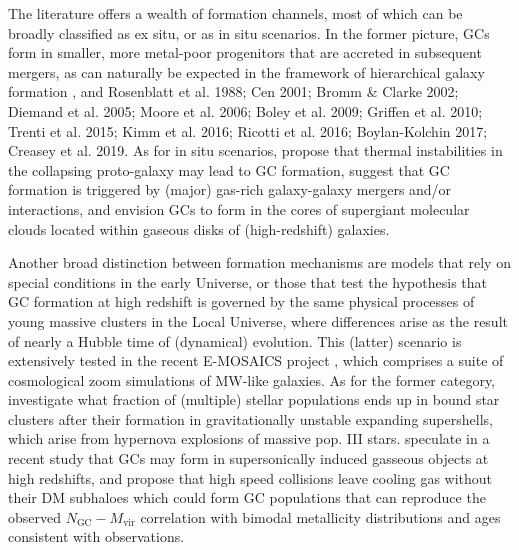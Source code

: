 \documentclass[a4paper,fleqn,usenatbib]{mnras}
\begin{document}
The literature offers a wealth of formation channels, most of which can be broadly
classified as ex situ, or as in situ scenarios. In the former picture, GCs form
in smaller, more metal-poor progenitors that are accreted in subsequent mergers,
as can naturally be expected in the framework of hierarchical galaxy formation
\citep[e.g.][]{1978ApJ...225..357S, 1984ApJ...277..470P}, and Rosenblatt et al. 1988;
Cen 2001; Bromm \& Clarke 2002; Diemand et al. 2005; Moore et al. 2006; Boley et al. 2009;
Griffen et al. 2010; Trenti et al. 2015; Kimm et al. 2016; Ricotti et al. 2016;
Boylan-Kolchin 2017; Creasey et al. 2019. As for in situ scenarios,
\citet{1985ApJ...298...18F} propose that thermal instabilities in the collapsing
proto-galaxy may lead to GC formation, \citet{1992ApJ...384...50A, 2010ApJ...718.1266M,
2018MNRAS.480.2343C} suggest that GC formation is triggered by (major) gas-rich
galaxy-galaxy mergers and/or interactions, and \citet{2005ApJ...623..650K} envision
GCs to form in the cores of supergiant molecular clouds located within gaseous disks
of (high-redshift) galaxies.

Another broad distinction between formation mechanisms are models that rely on
special conditions in the early Universe, or those that test the hypothesis that
GC formation at high redshift is governed by the same physical processes of young
massive clusters \citep[see][for a review]{2010ARA&A..48..431P} in the Local
Universe, where differences arise as the result of nearly a Hubble time of
(dynamical) evolution. This (latter) scenario is extensively tested in the recent
E-MOSAICS project \citep{2018MNRAS.475.4309P, 2019MNRAS.486.3134K}, which
comprises a suite of cosmological zoom simulations of MW-like galaxies. As for
the former category, \citet{2017Ap&SS.362..183R} investigate what fraction of
(multiple) stellar populations ends up in bound star clusters after their
formation in gravitationally unstable expanding supershells, which arise from
hypernova explosions of massive pop. III stars. \citet{2019arXiv190408941C}
speculate in a recent study that GCs may form in supersonically induced gasseous
objects at high redshifts, and \citet{2019arXiv190508951M} propose that high speed
collisions leave cooling gas without their DM subhaloes which could form GC
populations that can reproduce the observed $N_{\text{GC}}-M_{\text{vir}}$
correlation \citep[e.g.][]{2019arXiv190100900B} with bimodal metallicity
distributions and ages consistent with observations.
\end{document}
